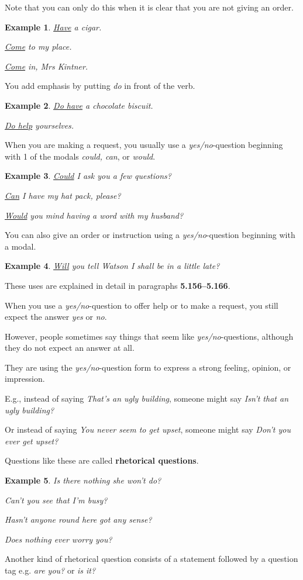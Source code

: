 \documentclass[oneside]{book}
\numberwithin{equation}{section}
\newtheorem{example}{Example}[section]
\begin{document}
Note that you can only do this when it is clear that you are not giving an order.
\begin{example}
    \underline{Have} a cigar.
    
    \underline{Come} to my place.
    
    \underline{Come} in, Mrs Kintner.
\end{example}
You add emphasis by putting \textit{do} in front of the verb.
\begin{example}
    \underline{Do have} a chocolate biscuit.
    
    \underline{Do help} yourselves.
\end{example}
%
\noindent{} When you are making a request, you usually use a \textit{yes/no}-question beginning with 1 of the modals \textit{could, can}, or \textit{would}.
\begin{example}
    \underline{Could} I ask you a few questions?
    
    \underline{Can} I have my hat pack, please?
    
    \underline{Would} you mind having a word with my husband?
\end{example}
You can also give an order or instruction using a \textit{yes/no}-question beginning with a modal.
\begin{example}
    \underline{Will} you tell Watson I shall be in a little late?
\end{example}
These uses are explained in detail in paragraphs \textbf{5.156--5.166}.

%
\noindent{} When you use a \textit{yes/no}-question to offer help or to make a request, you still expect the answer \textit{yes} or \textit{no}.

However, people sometimes say things that seem like \textit{yes/no}-questions, although they do not expect an answer at all.

They are using the \textit{yes/no}-question form to express a strong feeling, opinion, or impression.

%
E.g., instead of saying \textit{That's an ugly building}, someone might say \textit{Isn't that an ugly building?}

Or instead of saying \textit{You never seem to get upset}, someone might say \textit{Don't you ever get upset?}

%
Questions like these are called \textbf{rhetorical questions}.
\begin{example}
    Is there nothing she won't do?
    
    Can't you see that I'm busy?
    
    Hasn't anyone round here got any sense?
    
    Does nothing ever worry you?
\end{example}
Another kind of rhetorical question consists of a statement followed by a question tag e.g. \textit{are you?} or \textit{is it?}
\end{document}
